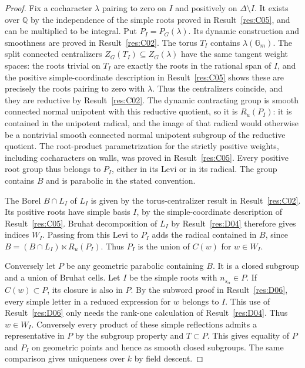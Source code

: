 \documentclass[11pt,a4paper,openany,oneside]{book}
\theoremstyle{resultstyle}
\theoremstyle{definition}
\numberwithin{equation}{chapter}
\newcommand{\Gm}{\mathbb{G}_m}
\newcommand{\QQ}{\mathbb{Q}}
\begin{document}
\begin{proof}
Fix a cocharacter \(\lambda\) pairing to zero on \(I\) and
positively on \(\Delta\setminus I\). It exists over \(\QQ\)
by the independence of the simple roots proved in
Result~\ref{res:C05}, and can be multiplied to be integral.
Put \(P_I=P_G(\lambda)\). Its dynamic construction and
smoothness are proved in Result~\ref{res:C02}.
The torus \(T_I\) contains \(\lambda(\Gm)\).
The split connected centralizers \(Z_G(T_I)\subseteq Z_G(\lambda)\)
have the same tangent weight spaces: the roots trivial on \(T_I\)
are exactly the roots in the rational span of \(I\), and the
positive simple-coordinate description in Result~\ref{res:C05}
shows these are precisely the roots pairing to zero with \(\lambda\).
Thus the centralizers coincide, and they are reductive by
Result~\ref{res:C02}. The dynamic contracting group is
smooth connected normal unipotent with this reductive quotient,
so it is \(R_u(P_I)\): it is contained in the unipotent
radical, and the image of that radical would otherwise be a
nontrivial smooth connected normal unipotent subgroup of the
reductive quotient. The root-product parametrization for the
strictly positive weights, including cocharacters on walls,
was proved in Result~\ref{res:C05}.
Every positive root group thus belongs to \(P_I\), either
in its Levi or in its radical. The group contains \(B\) and
is parabolic in the stated convention.

The Borel \(B\cap L_I\) of \(L_I\) is given by the
torus-centralizer result in Result~\ref{res:C02}.
Its positive roots have simple basis \(I\), by the
simple-coordinate description of Result~\ref{res:C05}.
Bruhat decomposition of \(L_I\) by Result~\ref{res:D04}
therefore gives indices \(W_I\).
Passing from this Levi to \(P_I\) adds the radical contained
in \(B\), since \(B=(B\cap L_I)\ltimes R_u(P_I)\).
Thus \(P_I\) is the union of \(C(w)\) for \(w\in W_I\).

Conversely let \(P\) be any geometric parabolic containing \(B\).
It is a closed subgroup and a union of Bruhat cells.
Let \(I\) be the simple roots with \(n_{s_\alpha}\in P\).
If \(C(w)\subset P\), its closure is also in \(P\). By the
subword proof in Result~\ref{res:D06}, every simple letter
in a reduced expression for \(w\) belongs to \(I\). This use
of Result~\ref{res:D06} only needs the rank-one calculation
of Result~\ref{res:D04}. Thus \(w\in W_I\). Conversely every
product of these simple reflections admits a representative
in \(P\) by the subgroup property and \(T\subset P\).
This gives equality of \(P\) and \(P_I\) on geometric
points and hence as smooth closed subgroups. The same
comparison gives uniqueness over \(k\) by field descent.


\end{proof}
\end{document}

